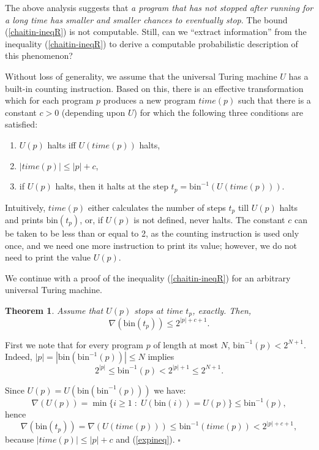 \documentclass[12pt,twoside,openright]{report}
\newtheorem{thm}{Theorem}
\newcommand{\QED}{\hfill $\square$}
\newcommand{\bin}{\mbox{bin}}
\newcommand{\myproof}{\noindent {\em Proof.}  }
\begin{document}
The above analysis suggests that {\it a program that has not stopped after running for a long time has smaller and smaller chances to eventually stop}. The bound (\ref{chaitin-ineqR}) is not computable.  Still, can we ``extract information'' from the inequality (\ref{chaitin-ineqR}) to derive a computable probabilistic description of this phenomenon? 


Without loss of generality, we assume that the universal Turing machine $U$ has a built-in counting instruction. Based on this, there is an effective transformation which for each program $p$ produces a new program $time(p)$ such that there is a constant $c>0$ (depending upon $U$) for which the following three conditions are satisfied:
\begin{enumerate}
\item $U(p)$ halts iff $U(time(p))$ halts,
\item $|time(p)| \le |p| + c$,
\item if $U(p)$ halts, then it halts at the step $t_{p} = \bin^{-1}(U(time(p)))$.
\end{enumerate}

Intuitively, $time(p)$ either calculates the number of steps $t_{p}$ till $U(p)$ halts and prints $\bin(t_{p})$, or, if $U(p)$ is not defined, never halts. The constant $c$ can be taken to be less than or equal to 2, as the counting instruction is used only once, and we need one more instruction to print its value; however, we  do not need to print the value $U(p)$. 

\medskip

We continue with a proof of the inequality (\ref{chaitin-ineqR}) for an arbitrary universal Turing machine.
  
\medskip

\begin{thm}
\label{nablaineq}
Assume that $U(p)$ stops at time $t_{p}$, exactly. Then,
\begin{equation}
\label{chaitin-ineqRR}\nabla (\bin (t_{p})) \le 2^{|p|+c+1}.
\end{equation}
\end{thm}
\myproof First we note that for every program $p$ of length at most $N$, $\bin^{-1}(p) < 2^{N+1}$. Indeed, $|p| =|\bin(\bin^{-1}(p))| \le N$ implies 
\begin{equation}
\label{expineq}
2^{|p|} \le \bin^{-1} (p) < 2^{|p|+1} \le  2^{N+1}.
\end{equation}

Since $U(p) = U(\bin(\bin^{-1}(p)))$ we have:
\[\nabla (U(p))  = \min\{i\ge 1\;:\; U(\bin(i))=U(p)\}\le \bin^{-1}(p),\]
\noindent hence
\[\nabla (\bin(t_{p}))  = \nabla (U(time(p)))  \le \bin^{-1}(time(p)) < 2^{|p| + c +1},\]
\noindent because $|time(p)| \le |p|+c$ and (\ref{expineq}). 
\QED
\end{document}
